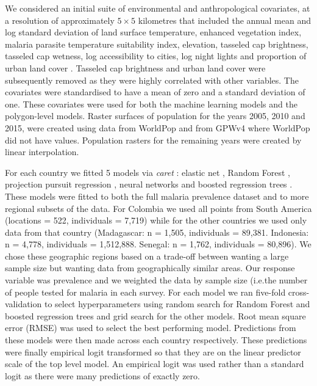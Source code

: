 \documentclass[11pt]{article}
\begin{document}
We considered an initial suite of environmental and anthropological covariates, at a resolution of approximately $5 \times 5$ kilometres that included the annual mean and log standard deviation of land surface temperature, enhanced vegetation index, malaria parasite temperature suitability index, elevation, tasseled cap brightness, tasseled cap wetness, log accessibility to cities, log night lights and proportion of urban land cover \citep{weiss2015re, weiss2018global}. 
Tasseled cap brightness and urban land cover were subsequently removed as they were highly correlated with other variables. 
The covariates were standardised to have a mean of zero and a standard deviation of one. 
These covariates were used for both the machine learning models and the polygon-level models.
Raster surfaces of population for the years 2005, 2010 and 2015, were created using data from WorldPop \citep{tatem2017worldpop} and from GPWv4 \citep{gpw4} where WorldPop did not have values. 
Population rasters for the remaining years were created by linear interpolation. 


For each country we fitted 5 models via \emph{caret} \citep{caret}: elastic net \citep{enet}, Random Forest \citep{wright2015ranger}, projection pursuit regression \citep{friedman1981projection}, neural networks \citep{nnet} and boosted regression trees \citep{gbm}.
These models were fitted to both the full malaria prevalence dataset and to more regional subsets of the data.
For Colombia we used all points from South America (locations = 522, individuals = 7,719) while for the other countries we used only data from that country (Madagascar: n = 1,505, individuals = 89,381. Indonesia: n = 4,778, individuals = 1,512,888. Senegal: n = 1,762, individuals = 80,896).
We chose these geographic regions based on a trade-off between wanting a large sample size but wanting data from geographically similar areas.
Our response variable was prevalence and we weighted the data by sample size (i.e.\thinspace the number of people tested for malaria in each survey.
For each model we ran  five-fold cross-validation to select hyperparameters using random search for Random Forest and boosted regression trees and grid search for the other models. 
Root mean square error (RMSE) was used to select the best performing model.
Predictions from these models were then made across each country respectively.
These predictions were finally empirical logit transformed so that they are on the linear predictor scale of the top level model.
An empirical logit was used rather than a standard logit as there were many predictions of exactly zero.
\end{document}
